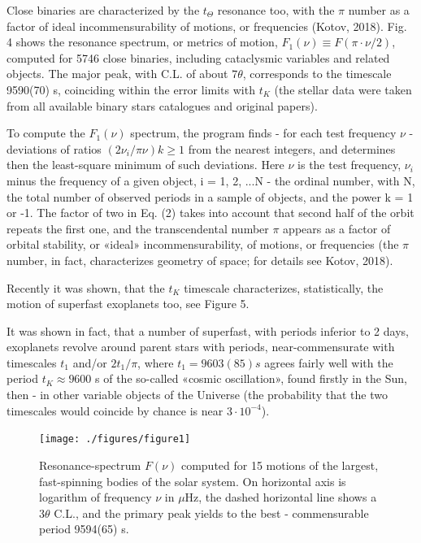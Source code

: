 \documentclass[twoside,draft]{article}
\begin{document}
\begin{sloppypar}
Close binaries are characterized by the $t_{\Theta}$ resonance too, with the $\pi$ number as a factor of ideal
incommensurability of motions, or frequencies (Kotov, 2018). Fig. 4 shows the resonance spectrum,
or metrics of motion, $F_{1} (\nu) \equiv F(\pi \cdot \nu/2)$, computed for 5746 close binaries, including cataclysmic
variables and related objects. The major peak, with C.L. of about $7 \theta$, corresponds to the timescale
9590(70) s, coinciding within the error limits with $t_{K}$ (the stellar data were taken from all available
binary stars catalogues and original papers).

To compute the $F_{1} (\nu)$ spectrum, the program finds - for each test frequency $\nu$ - deviations of
ratios $(2\nu_{i} /\pi \nu) k \geq 1$ from the nearest integers, and determines then the least-square minimum of such
deviations. Here $\nu$ is the test frequency, $\nu_{i}$ minus the frequency of a given object, i = 1, 2, ...N - the
ordinal number, with N, the total number of observed periods in a sample of objects, and the power
k = 1 or -1. The factor of two in Eq. (2) takes into account that second half of the orbit repeats the
first one, and the transcendental number $\pi$ appears as a factor of orbital stability, or «ideal»
incommensurability, of motions, or frequencies (the $\pi$ number, in fact, characterizes geometry of
space; for details see Kotov, 2018).

Recently it was shown, that the $t_K$ timescale characterizes, statistically, the motion of superfast
exoplanets too, see Figure 5.

It was shown in fact, that a number of superfast, with periods inferior to 2 days, exoplanets revolve
around parent stars with periods, near-commensurate with timescales $t_{1}$ and/or $2 t_{1}/\pi$, where $t_{1} =
9603(85) s$ agrees fairly well with the period $t_{K} \approx 9600$ s of the so-called «cosmic oscillation», found
firstly in the Sun, then - in other variable objects of the Universe (the probability that the two
timescales would coincide by chance is near $3 \cdot 10^{-4}$).

\begin{figure}
\centering
\texttt{[image: ./figures/figure1]}
\caption{Resonance-spectrum $F(\nu)$ computed for 15 motions of the largest, fast-spinning bodies of
the solar system. On horizontal axis is logarithm of frequency $\nu$ in $\mu$Hz, the dashed horizontal line
shows a $ 3 \theta $ C.L., and the primary peak yields to the best - commensurable period 9594(65) s.}
\label{fig:figure_label}
\end{figure}


\end{sloppypar}
\end{document}
